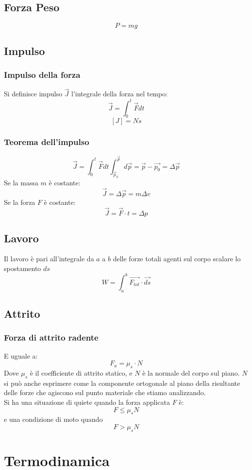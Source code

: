 \documentclass[a4paper]{report}
\begin{document}
  \section{Forza Peso}
  \[ P = mg \]

  \section{Impulso}
  \subsection{Impulso della forza}
  Si definisce impulso $ \vec{J} $ l'integrale della forza nel tempo:
  \[ \vec{J} = \int_0^t \vec{F} dt \]
  \[ [J] = N  s \]

  \subsection{Teorema dell'impulso}
  \[ \vec{J} = \int_0^t \vec{F} dt \int_{\vec{p}_0}^{\vec{p}} d\vec{p} = \vec{p} - \vec{p_0} = \Delta \vec{p} \]
  Se la massa $m$ è costante:
  \[ \vec{J} = \Delta \vec{p} = m \Delta v \]
  Se la forza $F$ è costante:
  \[ \vec{J} = \vec{F} \cdot t = \Delta p  \]

  \section{Lavoro}
  Il lavoro è pari all'integrale da $a$ a $b$ delle forze totali agenti sul corpo scalare lo spostamento $ds$
  \[ W = \int_{a}^{b} \vec{F_{tot}} \cdot \vec{ds} \]

  \section{Attrito}
  \subsection{Forza di attrito radente}
  E uguale a:
  \[ F_a = \mu_s \cdot N\]
  Dove $\mu_s$ è il coefficiente di attrito statico, e $N$ è la normale del corpo sul piano. $N$ si può anche esprimere come la componente ortogonale al piano della risultante delle forze che agiscono sul punto materiale che stiamo analizzando.
  \\Si ha una situazione di quiete quando la forza applicata $F$ è:
  \[ F \leq \mu_s N \]
  e una condizione di moto quando
  \[ F > \mu_s N \]

  \chapter{Termodinamica}
\end{document}
